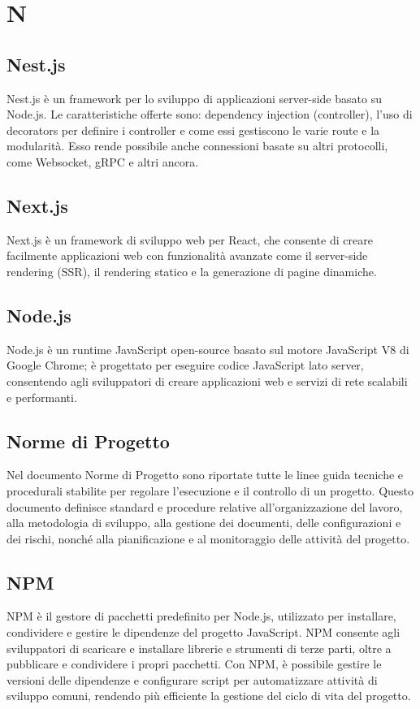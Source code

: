 \section*{N} 
\subsection*{Nest.js} 
Nest.js è un framework per lo sviluppo di applicazioni server-side basato su Node.js. Le caratteristiche offerte sono: dependency injection (controller), l'uso di decorators per definire i controller e come essi gestiscono le varie route e la modularità. Esso rende possibile anche connessioni basate su altri protocolli, come Websocket, gRPC e altri ancora.
\subsection*{Next.js} 
Next.js è un framework di sviluppo web per React, che consente di creare facilmente applicazioni web con funzionalità avanzate come il server-side rendering (SSR), il rendering statico e la generazione di pagine dinamiche.
\subsection*{Node.js} 
Node.js è un runtime JavaScript open-source basato sul motore JavaScript V8 di Google Chrome; è progettato per eseguire codice JavaScript lato server, consentendo agli sviluppatori di creare applicazioni web e servizi di rete scalabili e performanti.
\subsection*{Norme di Progetto} 
Nel documento Norme di Progetto sono riportate tutte le linee guida tecniche e procedurali stabilite per regolare l'esecuzione e il controllo di un progetto. Questo documento definisce standard e procedure relative all'organizzazione del lavoro, alla metodologia di sviluppo, alla gestione dei documenti, delle configurazioni e dei rischi, nonché alla pianificazione e al monitoraggio delle attività del progetto.
\subsection*{NPM} 
NPM è il gestore di pacchetti predefinito per Node.js, utilizzato per installare, condividere e gestire le dipendenze del progetto JavaScript. NPM consente agli sviluppatori di scaricare e installare librerie e strumenti di terze parti, oltre a pubblicare e condividere i propri pacchetti. Con NPM, è possibile gestire le versioni delle dipendenze e configurare script per automatizzare attività di sviluppo comuni, rendendo più efficiente la gestione del ciclo di vita del progetto.
